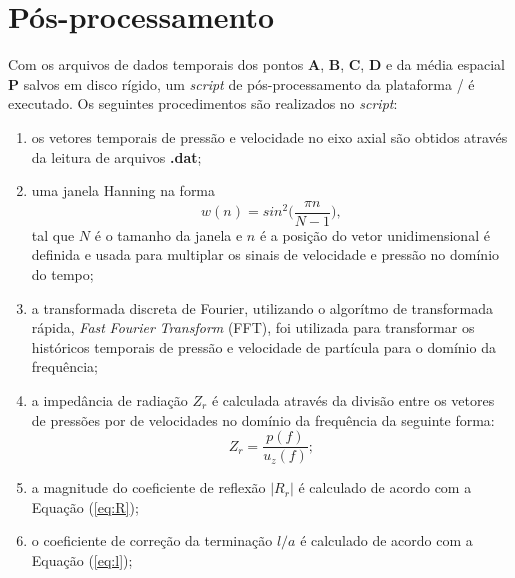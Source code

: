 



\section{Pós-processamento}

Com os arquivos de dados temporais dos pontos $\textbf{A}$, $\textbf{B}$, $\textbf{C}$, $\textbf{D}$ e da média espacial $\textbf{P}$ salvos em disco rígido, um \textit{script} de pós-processamento da plataforma / é executado. Os seguintes procedimentos são realizados no \textit{script}:

\begin{enumerate}
  \item os vetores temporais de pressão e velocidade no eixo axial são obtidos através da leitura de arquivos \textbf{.dat};
  \item uma janela Hanning na forma
  \begin{equation}
    w(n) = sin^{2}\bigg(\frac{\pi n}{N - 1} \bigg),  
  \end{equation}
  tal que $N$ é o tamanho da janela e $n$ é a posição do vetor unidimensional é definida e usada para multiplar os sinais de velocidade e pressão no domínio do tempo;

  \item a transformada discreta de Fourier, utilizando o algorítmo de transformada rápida, \textit{Fast} \textit{Fourier} \textit{Transform} (FFT), foi utilizada para transformar os históricos temporais de pressão e velocidade de partícula para o domínio da frequência;

  \item a impedância de radiação $Z_{r}$ é calculada através da divisão entre os vetores de pressões por de velocidades no domínio da frequência da seguinte forma:
  \begin{equation}
    Z_{r} = \frac{p(f)}{u_{z}(f)};
  \end{equation}

  \item a magnitude do coeficiente de reflexão $|R_{r}|$ é calculado de acordo com a Equação (\ref{eq:R});
  \item o coeficiente de correção da terminação $l/a$ é calculado de acordo com a Equação (\ref{eq:l});
 \end{enumerate}

